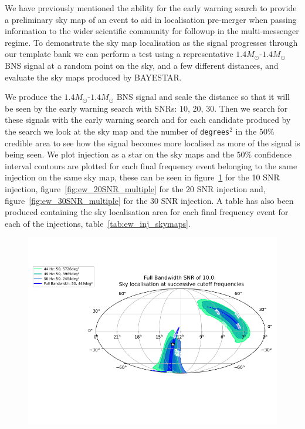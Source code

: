 We have previously mentioned the ability for the early warning search to provide a preliminary sky map of an event to aid in localisation pre-merger when passing information to the wider scientific community for followup in the multi-messenger regime. To demonstrate the sky map localisation as the signal progresses through our template bank we can perform a test using a representative $1.4M_\odot$-$1.4M_\odot$ BNS signal at a random point on the sky, and a few different distances, and evaluate the sky maps produced by BAYESTAR.

We produce the $1.4M_\odot$-$1.4M_\odot$ BNS signal and scale the distance so that it will be seen by the early warning search with SNRs: $10$, $20$, $30$. Then we search for these signals with the early warning search and for each candidate produced by the search we look at the sky map and the number of \verb|degrees|$^2$ in the 50\% credible area to see how the signal becomes more localised as more of the signal is being seen. We plot injection as a star on the sky maps and the $50\%$ confidence interval contours are plotted for each final frequency event belonging to the same injection on the same sky map, these can be seen in figure~\ref{fig:ew_10SNR_multiple} for the 10 SNR injection, figure~\ref{fig:ew_20SNR_multiple} for the 20 SNR injection and, figure~\ref{fig:ew_30SNR_multiple} for the 30 SNR injection. A table has also been produced containing the sky localisation area for each final frequency event for each of the injections, table~\ref{tab:ew_inj_skymaps}.
%
\begin{figure}
    \centering
    \includegraphics[width=\textwidth]{images/6_earlywarning/localisation/10SNR_multiple.png}
    \caption{}
    \label{fig:ew_10SNR_multiple}
\end{figure}
